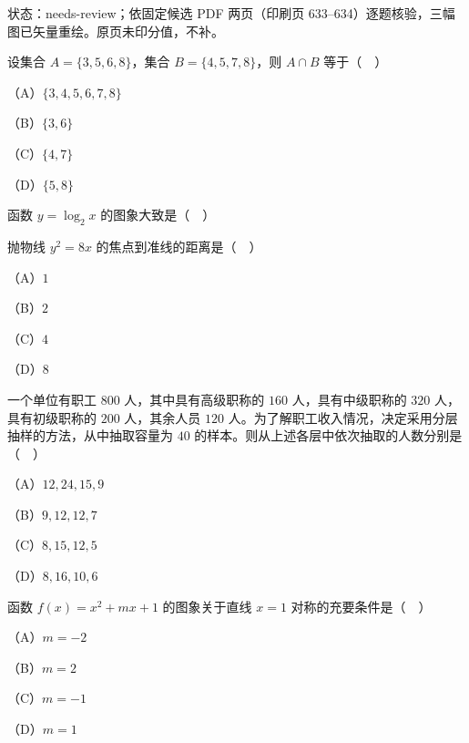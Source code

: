 

状态：needs-review；依固定候选 PDF 两页（印刷页 633–634）逐题核验，三幅图已矢量重绘。原页未印分值，不补。


\begin{question}
设集合 $A=\{3,5,6,8\}$，集合 $B=\{4,5,7,8\}$，则 $A\cap B$ 等于（　）

（A）$\{3,4,5,6,7,8\}$

（B）$\{3,6\}$

（C）$\{4,7\}$

（D）$\{5,8\}$

\Needspace{0.4\textheight}
\end{question}
\begingroup
\renewenvironment{question}{\Needspace{0.5\textheight}}{}
\begin{question}
函数 $y=\log_2x$ 的图象大致是（　）
\nopagebreak[4]
\begin{center}\end{center}
\nopagebreak[4]
\end{question}
\endgroup
\begin{question}
抛物线 $y^2=8x$ 的焦点到准线的距离是（　）

（A）$1$

（B）$2$

（C）$4$

（D）$8$

\end{question}
\begin{question}
一个单位有职工 $800$ 人，其中具有高级职称的 $160$ 人，具有中级职称的 $320$ 人，具有初级职称的 $200$ 人，其余人员 $120$ 人。为了解职工收入情况，决定采用分层抽样的方法，从中抽取容量为 $40$ 的样本。则从上述各层中依次抽取的人数分别是（　）

（A）$12,24,15,9$

（B）$9,12,12,7$

（C）$8,15,12,5$

（D）$8,16,10,6$

\end{question}
\begin{question}
函数 $f(x)=x^2+mx+1$ 的图象关于直线 $x=1$ 对称的充要条件是（　）

（A）$m=-2$

（B）$m=2$

（C）$m=-1$

（D）$m=1$

\end{question}
